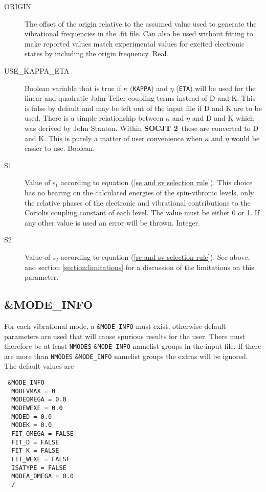 \documentclass{article}
\newcommand{\socjttwo}{{\bf SOCJT 2}}
\begin{document}
\begin{description}
  \item[ORIGIN] The offset of the origin relative to the assumed value used to generate the vibrational frequencies in the .fit file. Can also be used without fitting to make reported values match experimental values for excited electronic states by including the origin frequency. Real.
  
  
  \item[USE\_KAPPA\_ETA] Boolean variable that is true if $\kappa$ ({\tt KAPPA}) and 
  $\eta$ ({\tt ETA}) will be used for the linear and quadratic Jahn-Teller coupling
  terms instead of D and K. This is false by default and may be left out of the
  input file if D and K are to be used. There is a simple relationship between
  $\kappa$ and $\eta$ and D and K which was derived by John Stanton. Within
  \socjttwo\ these are converted to D and K. This is purely a matter of user convenience
  when $\kappa$ and $\eta$ would be easier to use. Boolean.

\item[S1] Value of s$_1$ according to equation (\ref{se and sv
    selection rule}). This choice has no bearing on the calculated
  energies of the spin-vibronic levels, only the relative phases of
  the electronic and vibrational contributions to the Coriolis
  coupling constant of each level. The value must be either 0 or 1. If any other value is used an error will be thrown. Integer. 

\item[S2] Value of s$_2$ according to equation (\ref{se and sv
    selection rule}). See above, and section \ref{section:limitations}
  for a discussion of the limitations on this parameter.

\end{description}

\subsection{\&MODE\_INFO}

For each vibrational mode, a {\tt \&MODE\_INFO} must exist, otherwise
default parameters are used that will cause spurious results for the
user. There must therefore be at least {\tt NMODES} {\tt \&MODE\_INFO} namelist groups in
the input file. If there are more than {\tt NMODES} {\tt \&MODE\_INFO} namelist groups the extras will be ignored. The default values are

\begin{verbatim}
 &MODE_INFO
  MODEVMAX = 0
  MODEOMEGA = 0.0
  MODEWEXE = 0.0
  MODED = 0.0
  MODEK = 0.0
  FIT_OMEGA = FALSE
  FIT_D = FALSE
  FIT_K = FALSE
  FIT_WEXE = FALSE
  ISATYPE = FALSE
  MODEA_OMEGA = 0.0
  /
\end{verbatim}
\end{document}
